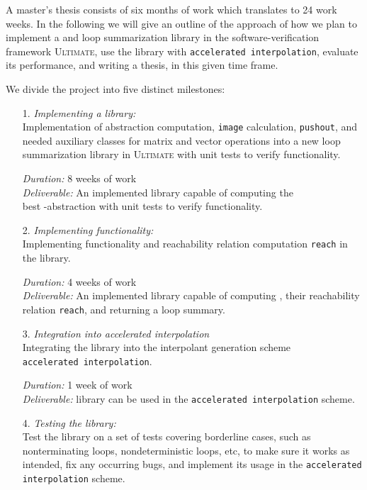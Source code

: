 A master's thesis consists of six months of work which translates to 24 work weeks. In the following we will give an outline of the approach of how we plan to implement a \qvasr and \qvasrs loop summarization library in the software-verification framework \textsc{Ultimate}, use the library with \texttt{accelerated interpolation}, evaluate its performance, and writing a thesis, in this given time frame. \\ \par
We divide the project into five distinct milestones:

\begin{itemize}
	\item[1.] \textsl{Implementing a \qvasr library:} \\
               Implementation of \qvasr abstraction computation, \qvasr \texttt{image} calculation, \texttt{pushout}, and needed auxiliary classes for matrix and vector operations into a new loop summarization library in \textsc{Ultimate} with unit tests to verify functionality.

			  \textsl{Duration:} 8 weeks of work \\
			  \textsl{Deliverable:} An implemented library capable of computing the \\ best \qvasr-abstraction with unit tests to verify functionality.

	\item[2.] \textsl{Implementing \qvasrs functionality:} \\
               Implementing \qvasrs functionality and reachability relation computation \texttt{reach} in the \qvasr library.

			  \textsl{Duration:} 4 weeks of work\\
			  \textsl{Deliverable:} An implemented library capable of computing \qvasrs, their reachability relation \texttt{reach}, and returning a loop summary.

	\item[3.] \textsl{Integration into accelerated interpolation} \\
			  Integrating the library into the interpolant generation scheme \\ \texttt{accelerated interpolation}.
	
			  \textsl{Duration:} 1 week of work \\
			  \textsl{Deliverable:} \qvasrs library can be used in the \texttt{accelerated interpolation} scheme.

	\item[4.] \textsl{Testing the library:} \\
               Test the library on a set of tests covering borderline cases, such as nonterminating loops, nondeterministic loops, etc, to make sure it works as intended, fix any occurring bugs, and implement its usage in the \texttt{accelerated interpolation} scheme.


\end{itemize}
